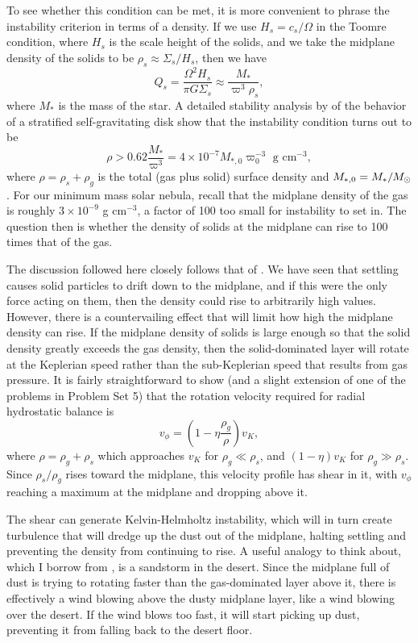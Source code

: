To see whether this condition can be met, it is more convenient to phrase the instability criterion in terms of a density. If we use $H_s=c_s/\Omega$ in the Toomre condition, where $H_s$ is the scale height of the solids, and we take the midplane density of the solids to be $\rho_s \approx \Sigma_s/H_s$, then we have
\begin{equation}
Q_s  = \frac{\Omega^2 H_s}{\pi G \Sigma_s} \approx \frac{M_*}{\varpi^3 \rho_s},
\end{equation}
where $M_*$ is the mass of the star. A detailed stability analysis by \citet{sekiya1983} of the behavior of a stratified self-gravitating disk show that the instability condition turns out to be
\begin{equation}
\rho > 0.62\frac{M_*}{\varpi^3} = 4\times 10^{-7} M_{*,0} \varpi_0^{-3} \mbox{ g cm}^{-3},
\end{equation}
where $\rho = \rho_s + \rho_g$ is the total (gas plus solid) surface density and $M_{*,0}=M_*/M_{\odot}$. For our minimum mass solar nebula, recall that the midplane density of the gas is roughly $3\times 10^{-9}$ g cm$^{-3}$, a factor of 100 too small for instability to set in. The question then is whether the density of solids at the midplane can rise to 100 times that of the gas.

The discussion followed here closely follows that of \citet{youdin02a}. We have seen that settling causes solid particles to drift down to the midplane, and if this were the only force acting on them, then the density could rise to arbitrarily high values. However, there is a countervailing effect that will limit how high the midplane density can rise. If the midplane density of solids is large enough so that the solid density greatly exceeds the gas density, then the solid-dominated layer will rotate at the Keplerian speed rather than the sub-Keplerian speed that results from gas pressure. It is fairly straightforward to show (and a slight extension of one of the problems in Problem Set 5) that the rotation velocity required for radial hydrostatic balance is
\begin{equation}
v_{\phi} = \left(1-\eta \frac{\rho_g}{\rho}\right) v_K,
\end{equation}
where $\rho = \rho_g + \rho_s$ which approaches $v_K$ for $\rho_g \ll \rho_s$, and $(1-\eta) v_K$ for $\rho_g \gg \rho_s$. Since $\rho_s / \rho_g$ rises toward the midplane, this velocity profile has shear in it, with $v_{\phi}$ reaching a maximum at the midplane and dropping above it.

The shear can generate Kelvin-Helmholtz instability, which will in turn create turbulence that will dredge up the dust out of the midplane, halting settling and preventing the density from continuing to rise. A useful analogy to think about, which I borrow from \citet{youdin02a}, is a sandstorm in the desert. Since the midplane full of dust is trying to rotating faster than the gas-dominated layer above it, there is effectively a wind blowing above the dusty midplane layer, like a wind blowing over the desert. If the wind blows too fast, it will start picking up dust, preventing it from falling back to the desert floor.

